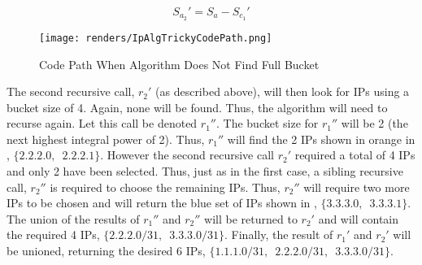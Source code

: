 \begin{equation}\label{eq:availableIpsSecondRecurse}
S_{a_2}' = S_a - S_{c_1}'
\end{equation}

\begin{figure}[H]
      \centering
      \texttt{[image: renders/IpAlgTrickyCodePath.png]}
      \caption{Code Path When Algorithm Does Not Find Full Bucket}
      \label{fig:ipAlgTrickyCodePath}
\end{figure}

The second recursive call, $r_2'$ (as described above), will then look for IPs using a bucket size of 4. Again, none will be found. Thus, the algorithm will need to recurse again. Let this call be denoted $r_1''$. The bucket size for $r_1''$ will be 2 (the next highest integral power of 2). Thus, $r_1''$ will find the 2 IPs shown in orange in , $\{2.2.2.0,\enspace2.2.2.1\}$. However the second recursive call $r_2'$ required a total of 4 IPs and only 2 have been selected. Thus, just as in the first case, a sibling recursive call, $r_2''$ is required to choose the remaining IPs. Thus, $r_2''$ will require two more IPs to be chosen and will return the blue set of IPs shown in , $\{3.3.3.0,\enspace3.3.3.1\}$. The union of the results of $r_1''$ and $r_2''$ will be returned to $r_2'$ and will contain the required 4 IPs, $\{2.2.2.0/31,\enspace3.3.3.0/31\}$. Finally, the result of $r_1'$ and $r_2'$ will be unioned, returning the desired 6 IPs, $\{1.1.1.0/31,\enspace2.2.2.0/31,\enspace3.3.3.0/31\}$.

